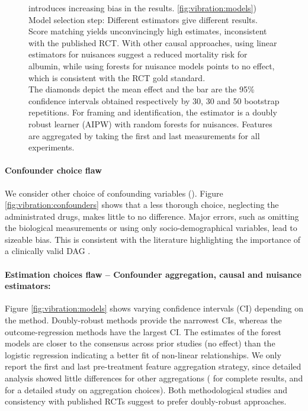 \documentclass[10pt,letterpaper]{article}
\begin{document}
\begin{figure}[h!]
{    introduces increasing bias in the results. \ref{fig:vibration:models}) Model selection step:
    Different estimators give different results. Score matching yields
    unconvincingly high estimates, inconsistent with the published RCT. With
    other causal approaches, using linear estimators for nuisances suggest a
    reduced mortality risk for albumin, while using forests for nuisance models
    points to no effect, which is consistent with the RCT gold standard.
    \\The diamonds depict the mean effect and the bar are the 95\% confidence
    intervals obtained respectively by 30, 30 and 50 bootstrap repetitions. For
    framing and identification, the estimator is a doubly robust learner (AIPW)
    with random forests for nuisances. Features are aggregated by taking the
    first and last measurements for all experiments.}\label{fig:vibration_analysis}
\end{figure}


\paragraph{Confounder choice flaw} We consider other choice of confounding variables
(). Figure
\ref{fig:vibration:confounders} shows that a less thorough choice, neglecting
the administrated drugs, makes little to no difference. Major errors, such as
omitting the biological measurements or using only socio-demographical
variables, lead to sizeable bias. This is consistent with the literature
highlighting the importance of a clinically valid DAG \cite{greenland1999causal}.

\paragraph{Estimation choices flaw -- Confounder aggregation, causal and nuisance estimators:}

Figure \ref{fig:vibration:models} shows varying confidence intervals (CI)
depending on the method. Doubly-robust methods provide the narrowest CIs,
whereas the outcome-regression methods have the largest CI. The estimates of the
forest models are closer to the consensus across prior studies (no effect) than
the logistic regression indicating a better fit of non-linear relationships. We
only report the first and last pre-treatment feature aggregation strategy, since
detailed analysis showed little differences for other aggregations ( for complete results, and  for a detailed study on aggregation choices). Both methodological studies \cite{naimi2023challenges} and
consistency with published RCTs suggest to prefer doubly-robust approaches.
\end{document}
